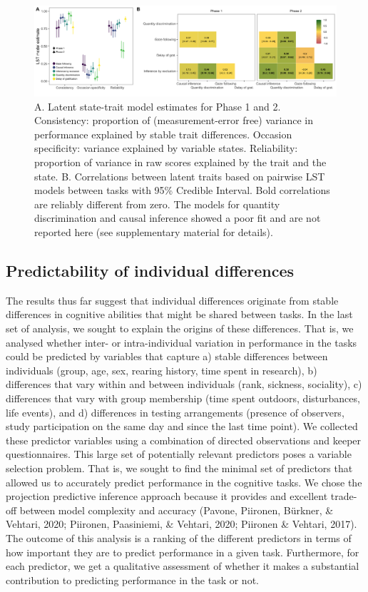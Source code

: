 \documentclass[
  man,floatsintext]{apa6}
\begin{document}
\begin{figure}
\includegraphics[width=1\linewidth]{./figures/lstm} \caption{A. Latent state-trait model estimates for Phase 1 and 2. Consistency: proportion of (measurement-error free) variance in performance explained by stable trait differences. Occasion specificity: variance explained by variable states. Reliability: proportion of variance in raw scores explained by the trait and the state. B. Correlations between latent traits based on pairwise LST models between tasks with 95\% Credible Interval. Bold correlations are reliably different from zero. The models for quantity discrimination and causal inference showed a poor fit and are not reported here (see supplementary material for details).}\label{fig:lstmplot}
\end{figure}

\hypertarget{predictability-of-individual-differences}{%
\subsection{Predictability of individual differences}\label{predictability-of-individual-differences}}

The results thus far suggest that individual differences originate from stable differences in cognitive abilities that might be shared between tasks. In the last set of analysis, we sought to explain the origins of these differences. That is, we analysed whether inter- or intra-individual variation in performance in the tasks could be predicted by variables that capture a) stable differences between individuals (group, age, sex, rearing history, time spent in research), b) differences that vary within and between individuals (rank, sickness, sociality), c) differences that vary with group membership (time spent outdoors, disturbances, life events), and d) differences in testing arrangements (presence of observers, study participation on the same day and since the last time point). We collected these predictor variables using a combination of directed observations and keeper questionnaires. This large set of potentially relevant predictors poses a variable selection problem. That is, we sought to find the minimal set of predictors that allowed us to accurately predict performance in the cognitive tasks. We chose the projection predictive inference approach because it provides and excellent trade-off between model complexity and accuracy (Pavone, Piironen, Bürkner, \& Vehtari, 2020; Piironen, Paasiniemi, \& Vehtari, 2020; Piironen \& Vehtari, 2017). The outcome of this analysis is a ranking of the different predictors in terms of how important they are to predict performance in a given task. Furthermore, for each predictor, we get a qualitative assessment of whether it makes a substantial contribution to predicting performance in the task or not.
\end{document}
